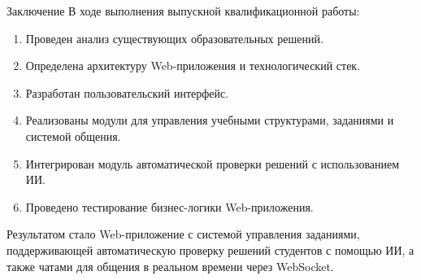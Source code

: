 \documentclass[aspectratio=169]{beamer}
\begin{document}
\begin{frame}{Заключение}
\small
В ходе выполнения выпускной квалификационной работы:

\begin{enumerate}
	\item Проведен анализ существующих образовательных решений.
	\item Определена архитектуру Web-приложения и технологический стек.
	\item Разработан пользовательский интерфейс.
	\item Реализованы модули для управления учебными структурами, заданиями и системой общения.
	\item Интегрирован модуль автоматической проверки решений с использованием ИИ.
	\item Проведено тестирование бизнес-логики Web-приложения.
\end{enumerate}

Результатом стало Web-приложение с системой управления заданиями, поддерживающей автоматическую проверку решений студентов с помощью ИИ, а также чатами для общения в реальном времени через WebSocket.
\end{frame}
\end{document}
